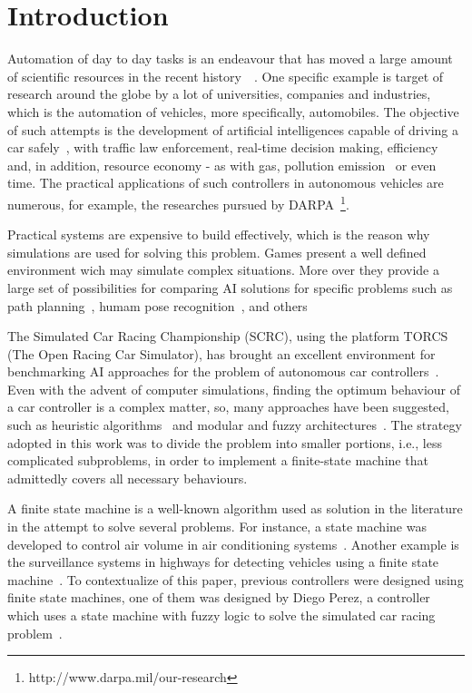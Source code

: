 \section{\textbf{Introduction}} \label{sec:Intro}
	
	Automation of day to day tasks is an endeavour that has moved a large amount of scientific resources in the recent history~\cite{INDUS}~\cite{APPLI}. One specific example is target of research around the globe by a lot of universities, companies	and industries, which is the automation of vehicles, more specifically, automobiles. The objective of such attempts is the development of artificial intelligences capable of driving a car safely~\cite{SAFE}, with traffic law enforcement, real-time decision making, efficiency and, in addition, resource economy - as with gas, pollution emission~\cite{AUTOM} or even time. The practical applications of such controllers in autonomous vehicles are numerous, for example, the researches pursued by DARPA~\footnote{http://www.darpa.mil/our-research}.
	
	Practical systems are expensive to build effectively, which is the reason why simulations are used for solving this problem. Games present a well defined environment wich may simulate complex situations. More over they provide a large set of possibilities for comparing AI solutions for specific problems such as path planning~\cite{deFreitas:2012}, humam pose recognition~\cite{Shotton:2011}, and others

	The Simulated Car Racing Championship (SCRC), using the platform TORCS (The Open Racing Car Simulator), has	brought an excellent environment for benchmarking AI approaches for the problem of autonomous car controllers~\cite{2009}. Even with the advent of computer simulations, finding the optimum behaviour of a car controller is a complex matter, so, many approaches have been suggested, such as heuristic algorithms~\cite{MrRacer} and modular and fuzzy architectures~\cite{AUTOPIA}. The strategy adopted in this work was to divide the problem into smaller portions, i.e., less complicated subproblems, in order to implement a finite-state machine that admittedly covers all necessary behaviours.

    A finite state machine is a well-known algorithm used as solution in the literature in the attempt to solve several problems. For instance, a state machine was developed to control air volume in air conditioning systems~\cite{BERNARD}. Another example is the surveillance systems in highways for detecting vehicles using a finite state machine~\cite{DOHYUN}. To contextualize of this paper, previous controllers were designed using finite state machines, one of them was designed by Diego Perez, a controller which uses a state machine with fuzzy logic to solve the simulated car racing problem~\cite{DIEGO}.
	
